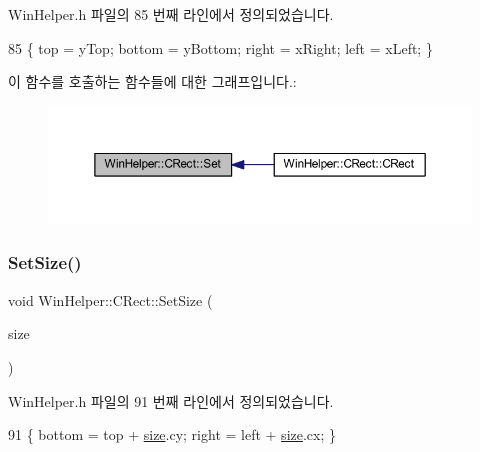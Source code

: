 Win\+Helper.\+h 파일의 85 번째 라인에서 정의되었습니다.


\begin{DoxyCode}
85 \{ top = yTop; bottom = yBottom; right = xRight; left = xLeft; \}
\end{DoxyCode}
이 함수를 호출하는 함수들에 대한 그래프입니다.\+:
\nopagebreak
\begin{figure}[H]
\begin{center}
\leavevmode
\includegraphics[width=350pt]{class_win_helper_1_1_c_rect_a5cc306b936afd8a1fe8321a7846ad260_icgraph}
\end{center}
\end{figure}
\mbox{\label{class_win_helper_1_1_c_rect_ab53ec9397692f842d8a5c289d44e4741}} 
\subsubsection{\texorpdfstring{Set\+Size()}{SetSize()}\hspace{0.1cm}{\footnotesize\ttfamily [1/3]}}
{\footnotesize\ttfamily void Win\+Helper\+::\+C\+Rect\+::\+Set\+Size (\begin{DoxyParamCaption}\item[{\mbox{\hyperlink{getopt1_8c_a2c212835823e3c54a8ab6d95c652660e}{const}} \mbox{\hyperlink{class_win_helper_1_1_c_size}{C\+Size}} \&}]{size }\end{DoxyParamCaption})\hspace{0.3cm}{\ttfamily [inline]}}



Win\+Helper.\+h 파일의 91 번째 라인에서 정의되었습니다.


\begin{DoxyCode}
91 \{ bottom = top + \mbox{\hyperlink{expr-lex_8cpp_ab7d671599a7b25ca99a487fa341bc33a}{size}}.cy; right = left + \mbox{\hyperlink{expr-lex_8cpp_ab7d671599a7b25ca99a487fa341bc33a}{size}}.cx; \}
\end{DoxyCode}
\mbox{\label{class_win_helper_1_1_c_rect_a00602a2018250d3fb661831c0aa65ca1}} 

